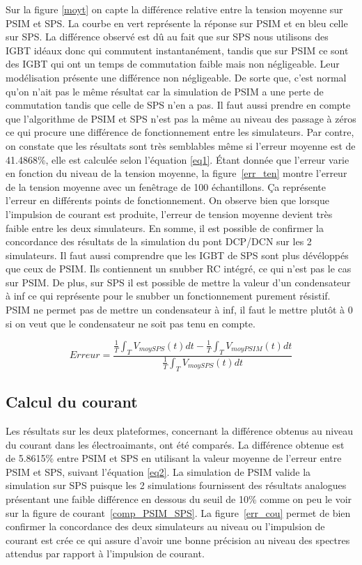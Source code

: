 \documentclass[11pt,letterpaper,final]{report}
\begin{document}
Sur la figure \ref{moyt} on capte la différence relative entre la tension moyenne sur PSIM et SPS. La courbe en vert représente la réponse sur PSIM et en bleu celle sur SPS. La différence observé est dû au fait que sur SPS nous utilisons des IGBT idéaux donc qui commutent instantanément, tandis que sur PSIM ce sont des IGBT qui ont un temps de commutation faible mais non négligeable. Leur modélisation présente une différence non négligeable. De sorte que, c'est normal qu'on n'ait pas le même résultat car la simulation de PSIM a une perte de commutation tandis que celle de SPS n'en a pas. Il faut aussi prendre en compte que l'algorithme de PSIM et SPS n'est pas la même au niveau des passage à zéros ce qui procure une différence de fonctionnement entre les simulateurs. Par contre, on constate que les résultats sont très semblables même si l'erreur moyenne est de 41.4868\%, elle est calculée selon l'équation \ref{eq1}. Étant donnée que l'erreur varie en fonction du niveau de la tension moyenne, la figure~\ref{err_ten} montre l'erreur de la tension moyenne avec un fenêtrage de 100 échantillons. Ça représente l'erreur en différents points de fonctionnement. On observe bien que lorsque l'impulsion de courant est produite, l'erreur de tension moyenne devient très faible entre les deux simulateurs. En somme, il est possible de confirmer la concordance des résultats de la simulation du pont DCP/DCN sur les 2 simulateurs. Il faut aussi comprendre que les IGBT de SPS sont plus dévéloppés que ceux de PSIM. Ils contiennent un snubber RC intégré, ce qui n'est pas le cas sur PSIM. De plus, sur SPS il est possible de mettre la valeur d'un condensateur à inf ce qui représente pour le snubber un fonctionnement purement résistif. PSIM ne permet pas de mettre un condensateur à inf, il faut le mettre plutôt à 0 si on veut que le condensateur ne soit pas tenu en compte.


\begin{equation}
Erreur = \frac{\frac{1}{T}\int_TV_{moy SPS}(t)dt-\frac{1}{T}\int_TV_{moy PSIM}(t)dt}{\frac{1}{T}\int_TV_{moy SPS}(t)dt}
\label{eq1}
\end{equation}




\subsection{Calcul du courant}
Les résultats sur les deux plateformes, concernant la différence obtenus au niveau du courant dans les électroaimants, ont été comparés. La différence obtenue est de 5.8615\% entre PSIM et SPS en utilisant la valeur moyenne de l'erreur entre PSIM et SPS, suivant l'équation \ref{eq2}. La simulation de PSIM valide la simulation sur SPS puisque les 2 simulations fournissent des résultats analogues présentant une faible différence en dessous du seuil de 10\% comme on peu le voir sur la figure de courant~\ref{comp_PSIM_SPS}. La figure~\ref{err_cou} permet de bien confirmer la concordance des deux simulateurs au niveau ou l'impulsion de courant est crée ce qui assure d'avoir une bonne précision au niveau des spectres attendus par rapport à l'impulsion de courant.
\end{document}
